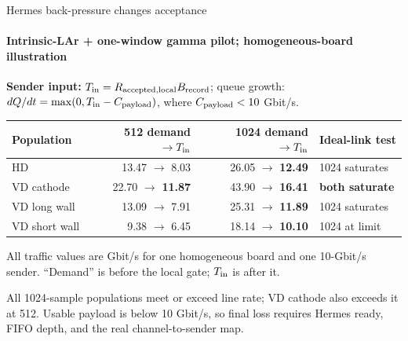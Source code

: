 \documentclass[aspectratio=169,11pt]{beamer}
\begin{document}
\begin{frame}{Hermes back-pressure changes acceptance}
  \framesubtitle{Intrinsic-LAr + one-window gamma pilot; homogeneous-board illustration}
  \footnotesize
  \textbf{Sender input:} $T_{\rm in}=R_{\rm accepted,local}B_{\rm record}$;
  queue growth: $dQ/dt=\max(0,T_{\rm in}-C_{\rm payload})$, where
  $C_{\rm payload}<10$ Gbit/s.

  \centering
  \setlength{\tabcolsep}{4pt}
  \renewcommand{\arraystretch}{1.00}
  \begin{tabular}{@{}lrrl@{}}
    \toprule
    Population & 512 demand $\rightarrow T_{\rm in}$ & 1024 demand $\rightarrow T_{\rm in}$ & Ideal-link test \\
    \midrule
    HD & 13.47 $\rightarrow$ 8.03 & 26.05 $\rightarrow$ \textbf{12.49} & 1024 saturates \\
    VD cathode & 22.70 $\rightarrow$ \textbf{11.87} & 43.90 $\rightarrow$ \textbf{16.41} & \textbf{both saturate} \\
    VD long wall & 13.09 $\rightarrow$ 7.91 & 25.31 $\rightarrow$ \textbf{11.89} & 1024 saturates \\
    VD short wall & 9.38 $\rightarrow$ 6.45 & 18.14 $\rightarrow$ \textbf{10.10} & 1024 at limit \\
    \bottomrule
  \end{tabular}

  All traffic values are Gbit/s for one homogeneous board and one 10-Gbit/s sender. ``Demand'' is before the local gate; $T_{\rm in}$ is after it.

    {All 1024-sample populations meet or exceed line rate; VD cathode also exceeds it at 512. Usable payload is below 10 Gbit/s, so final loss requires Hermes ready, FIFO depth, and the real channel-to-sender map.}
\end{frame}
\end{document}
